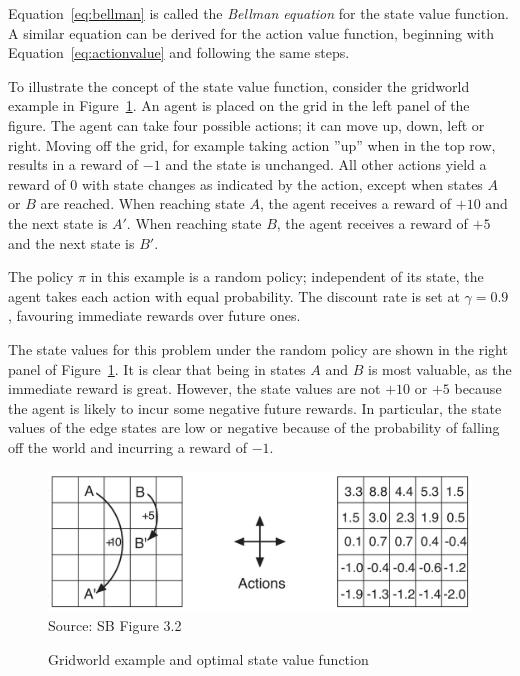 Equation~\ref{eq:bellman} is called the \emph{Bellman equation} for the state value function. A similar equation can be derived for the action value function, beginning with Equation~\ref{eq:actionvalue} and following the same steps. 

To illustrate the concept of the state value function, consider the gridworld example in Figure~\ref{fig:sb32}. An agent is placed on the grid in the left panel of the figure. The agent can take four possible actions; it can move up, down, left or right. Moving off the grid, for example taking action ''up'' when in the top row, results in a reward of $-1$ and the state is unchanged. All other actions yield a reward of $0$ with state changes as indicated by the action, except when states $A$ or $B$ are reached. When reaching state $A$, the agent receives a reward of $+10$ and the next state is $A'$. When reaching state $B$, the agent receives a reward of $+5$ and the next state is $B'$.

The policy $\pi$ in this example is a random policy; independent of its state, the agent takes each action with equal probability. The discount rate is set at $\gamma = 0.9$, favouring immediate rewards over future ones.

The state values for this problem under the random policy are shown in the right panel of Figure~\ref{fig:sb32}. It is clear that being in states $A$ and $B$ is most valuable, as the immediate reward is great. However, the state values are not $+10$ or $+5$ because the agent is likely to incur some negative future rewards. In particular, the state values of the edge states are low or negative because of the probability of falling off the world and incurring a reward of $-1$. 

\begin{figure}
\centering
\includegraphics[width=.75\textwidth]{screen4.png} \\

\scriptsize Source: SB Figure 3.2 \normalsize
\caption{Gridworld example and optimal state value function}
\label{fig:sb32}
\end{figure}

